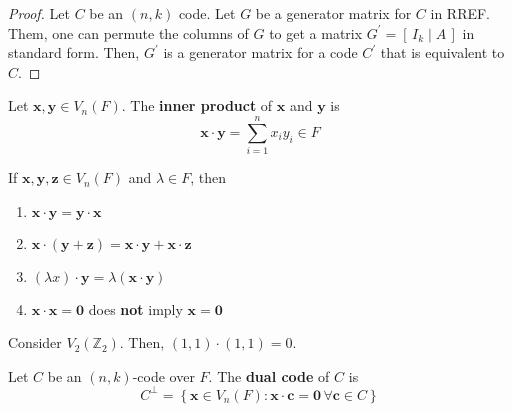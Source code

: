\begin{proof}
    Let $ C $ be an $ (n,k) $ code. Let $ G $ be a generator matrix for $ C $
    in RREF. Them, one can permute the columns of $ G $ to get a matrix
    $ G^{\prime}=\left[ \,I_k\mid A\, \right] $ in standard form. Then,
    $ G^{\prime} $ is a generator matrix for a code $ C^{\prime} $ that is
    equivalent to $ C $.
\end{proof}

\begin{defbox}
    \begin{definition}
        Let $ \bm{x},\bm{y}\in V_n(F) $. The \textbf{inner product}
        of $ \bm{x} $ and $ \bm{y} $ is
        \[ \bm{x}\cdot \bm{y}=\sum\limits_{i=1}^{n} x_iy_i\in F \]
    \end{definition} \end{defbox}

\begin{thmbox}
    \begin{theorem}
        If $ \bm{x},\bm{y},\bm{z}\in V_n(F) $ and $ \lambda\in F $, then
        \begin{enumerate}[(1)]
            \item $ \bm{x}\cdot \bm{y}=\bm{y}\cdot \bm{x} $
            \item $ \bm{x}\cdot (\bm{y}+\bm{z})=\bm{x}\cdot \bm{y}+\bm{x}\cdot \bm{z} $
            \item $ (\lambda x)\cdot \bm{y}=\lambda(\bm{x}\cdot \bm{y}) $
            \item $ \bm{x}\cdot \bm{x}=\bm{0}$ does \textbf{not} imply $ \bm{x}=\bm{0} $
        \end{enumerate}
    \end{theorem} \end{thmbox}

\begin{exbox}
    \begin{example}
        Consider $ V_2(\mathbb{Z}_2) $. Then, $ (1,1)\cdot(1,1)=0 $.
    \end{example}
\end{exbox}

\begin{defbox}
    \begin{definition}
        Let $ C $ be an $ (n,k) $-code over $ F $. The \textbf{dual code}
        of $ C $ is
        \[ C^{\perp}=\left\{ \bm{x}\in V_n(F):\bm{x}\cdot \bm{c}=\bm{0}\,\forall \bm{c}\in C\right\} \]
    \end{definition} \end{defbox}

